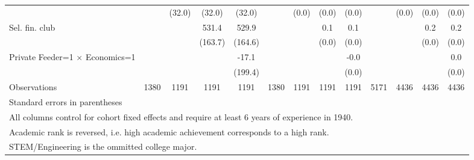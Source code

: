 \begin{tabular}{l*{12}{c}}
                    &            &      (32.0)&      (32.0)&      (32.0)&            &       (0.0)&       (0.0)&       (0.0)&            &       (0.0)&       (0.0)&       (0.0)\\
\addlinespace
Sel. fin. club      &            &            &       531.4&       529.9&            &            &         0.1&         0.1&            &            &         0.2&         0.2\\
                    &            &            &     (163.7)&     (164.6)&            &            &       (0.0)&       (0.0)&            &            &       (0.0)&       (0.0)\\
\addlinespace
Private Feeder=1 $\times$ Economics=1&            &            &            &       -17.1&            &            &            &        -0.0&            &            &            &         0.0\\
                    &            &            &            &     (199.4)&            &            &            &       (0.0)&            &            &            &       (0.0)\\
\midrule
Observations        &        1380&        1191&        1191&        1191&        1380&        1191&        1191&        1191&        5171&        4436&        4436&        4436\\
\bottomrule
\multicolumn{13}{l}{\footnotesize Standard errors in parentheses}\\
\multicolumn{13}{l}{\footnotesize All columns control for cohort fixed effects and require at least 6 years of experience in 1940.}\\
\multicolumn{13}{l}{\footnotesize Academic rank is reversed, i.e. high academic achievement corresponds to a high rank.}\\
\multicolumn{13}{l}{\footnotesize STEM/Engineering is the ommitted college major.}\\
\end{tabular}
